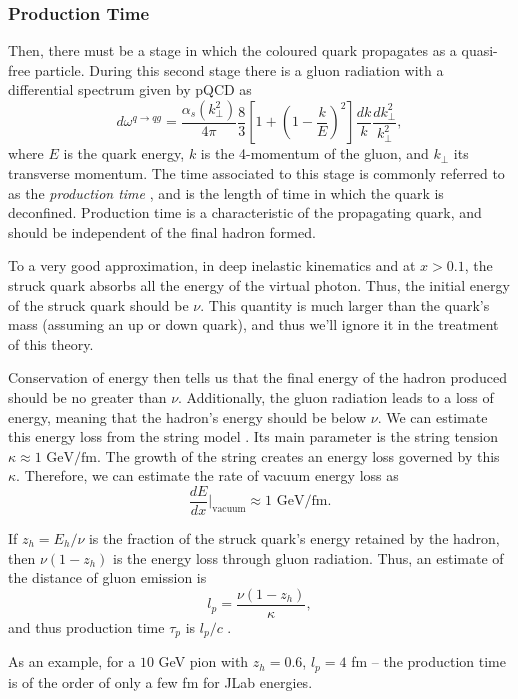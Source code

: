 \subsubsection{Production Time}
\label{sssec::production_time}
    Then, there must be a stage in which the coloured quark propagates as a quasi-free particle.
    During this second stage there is a gluon radiation with a differential spectrum given by pQCD as
    \begin{equation*}
        d\omega^{q \rightarrow qg} =
                \frac{\alpha_s(k_\perp^2)}{4\pi}
                \frac{8}{3}\left[ 1 + \left( 1 - \frac{k}{E} \right)^2 \right]
                \frac{dk}{k} \frac{dk_\perp^2}{k_\perp^2},
    \end{equation*}
    where $E$ is the quark energy, $k$ is the 4-momentum of the gluon, and $k_\perp$ its transverse momentum.
    The time associated to this stage is commonly referred to as the \textit{production time} \cite{kopeliovich2004}, and is the length of time in which the quark is deconfined.
    Production time is a characteristic of the propagating quark, and should be independent of the final hadron formed.

    To a very good approximation, in deep inelastic kinematics and at $x > 0.1$, the struck quark absorbs all the energy of the virtual photon.
    Thus, the initial energy of the struck quark should be $\nu$.
    This quantity is much larger than the quark's mass (assuming an up or down quark), and thus we'll ignore it in the treatment of this theory.

    Conservation of energy then tells us that the final energy of the hadron produced should be no greater than $\nu$.
    Additionally, the gluon radiation leads to a loss of energy, meaning that the hadron's energy should be below $\nu$.
    We can estimate this energy loss from the string model \cite{artru1974}.
    Its main parameter is the string tension $\kappa \approx 1 \text{ GeV}/\text{fm}$.
    The growth of the string creates an energy loss governed by this $\kappa$.
    Therefore, we can estimate the rate of vacuum energy loss as
    \begin{equation*}
        \frac{dE}{dx}\Big|_\text{vacuum} \approx 1 \text{ GeV}/\text{fm}.
    \end{equation*}

    If $z_h = E_h/\nu$ is the fraction of the struck quark's energy retained by the hadron, then $\nu(1 - z_h)$ is the energy loss through gluon radiation.
    Thus, an estimate of the distance of gluon emission is
    \begin{equation*}
        l_p = \frac{\nu(1 - z_h)}{\kappa},
    \end{equation*}
    and thus production time $\tau_p$ is $l_p/c$ \cite{kopeliovich2004}.

    As an example, for a $10$ GeV pion with $z_h = 0.6$, $l_p = 4$ fm -- the production time is of the order of only a few fm for JLab energies.
